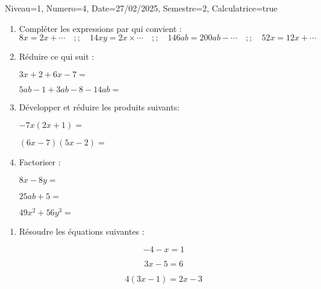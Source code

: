 \documentclass[a4paper,12pt]{article}
\begin{document}
\begin{Maquette}[DS]{Niveau=1, Numero=4, Date=27/02/2025, Semestre=2, Calculatrice=true}

\begin{exercice}

\begin{enumerate}


\item{} Compléter les expressions par qui convient :
\[
 8x = 2x + \cdots\quad ;; \quad
 14xy = 2x \times \cdots\quad ;; \quad
 146 ab = 200 ab - \cdots\quad ;; \quad
 52 x = 12 x + \cdots
\]

\item{} Réduire ce qui suit :
\begin{multicols}{2}
$3x+2+6x-7=$\anserline[3]
\columnbreak

$5ab-1+3ab-8-14ab=$\anserline[3]

\end{multicols}

\item{} Développer et réduire les produits suivants:
\begin{multicols}{2}
$-7x(2x+1)=$\anserline[2]

\columnbreak

$(6x-7)(5x-2)=$\anserline[2]
\end{multicols}

\item{} Factoriser :
\begin{multicols}{3}
$8x-8y=$\anserline[2]

\columnbreak

$25ab+5=$\anserline[2]

\columnbreak

$49x^{2}+56y^{3}=$\anserline[2]
\end{multicols}
\end{enumerate}

\end{exercice}

\begin{exercice}
\begin{enumerate}

\item{} Résoudre les équations suivantes :
\begin{multicols}{3}
 \[-4-x=1\]
\anserline[5]
\columnbreak

 \[3x-5=6\]
\anserline[5]
\columnbreak

 \[4(3x-1)=2x-3\]
\anserline[5]
\end{multicols}

\end{enumerate}
\end{exercice}



\end{Maquette}
\end{document}
